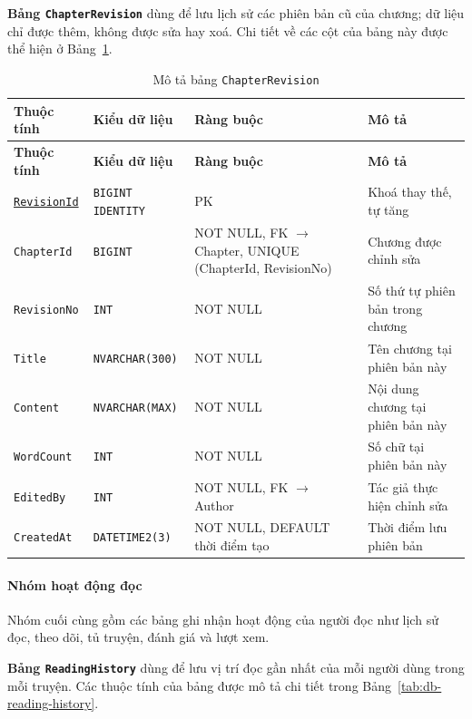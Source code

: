 \textbf{Bảng \texttt{ChapterRevision}} dùng để lưu lịch sử các phiên bản cũ của chương; dữ liệu chỉ được thêm, không được sửa hay xoá. Chi tiết về các cột của bảng này được thể hiện ở Bảng~\ref{tab:db-chapter-revision}.


{\small
\renewcommand{\arraystretch}{1.2}
\begin{longtable}{|>{\raggedright\arraybackslash}p{3.1cm}|>{\raggedright\arraybackslash}p{2.7cm}|>{\raggedright\arraybackslash}p{4.0cm}|>{\raggedright\arraybackslash}p{5.4cm}|}
\caption{Mô tả bảng \texttt{ChapterRevision}}\label{tab:db-chapter-revision}\\
\hline
\textbf{Thuộc tính} & \textbf{Kiểu dữ liệu} & \textbf{Ràng buộc} & \textbf{Mô tả} \\ \hline
\endfirsthead
\hline
\textbf{Thuộc tính} & \textbf{Kiểu dữ liệu} & \textbf{Ràng buộc} & \textbf{Mô tả} \\ \hline
\endhead
\underline{\texttt{RevisionId}} & \texttt{BIGINT IDENTITY} & PK & Khoá thay thế, tự tăng \\ \hline
\texttt{ChapterId} & \texttt{BIGINT} & NOT NULL, FK $\rightarrow$ Chapter, UNIQUE (ChapterId, RevisionNo) & Chương được chỉnh sửa \\ \hline
\texttt{RevisionNo} & \texttt{INT} & NOT NULL & Số thứ tự phiên bản trong chương \\ \hline
\texttt{Title} & \texttt{NVARCHAR(300)} & NOT NULL & Tên chương tại phiên bản này \\ \hline
\texttt{Content} & \texttt{NVARCHAR(MAX)} & NOT NULL & Nội dung chương tại phiên bản này \\ \hline
\texttt{WordCount} & \texttt{INT} & NOT NULL & Số chữ tại phiên bản này \\ \hline
\texttt{EditedBy} & \texttt{INT} & NOT NULL, FK $\rightarrow$ Author & Tác giả thực hiện chỉnh sửa \\ \hline
\texttt{CreatedAt} & \texttt{DATETIME2(3)} & NOT NULL, DEFAULT thời điểm tạo & Thời điểm lưu phiên bản \\ \hline
\end{longtable}
}


\paragraph{Nhóm hoạt động đọc}
Nhóm cuối cùng gồm các bảng ghi nhận hoạt động của người đọc như lịch sử đọc, theo dõi, tủ truyện, đánh giá và lượt xem.

\textbf{Bảng \texttt{ReadingHistory}} dùng để lưu vị trí đọc gần nhất của mỗi người dùng trong mỗi truyện. Các thuộc tính của bảng được mô tả chi tiết trong Bảng~\ref{tab:db-reading-history}.


